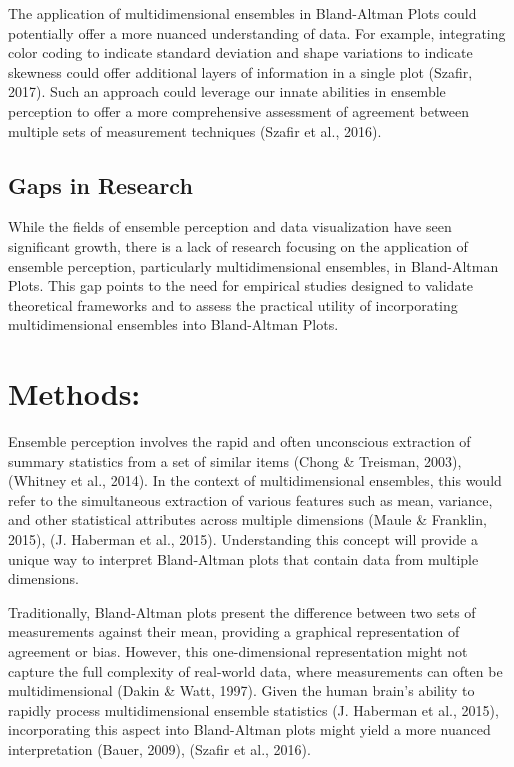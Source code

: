 \documentclass[print]{nuthesis}
\begin{document}
The application of multidimensional ensembles in Bland-Altman Plots could potentially offer a more nuanced understanding of data.
For example, integrating color coding to indicate standard deviation and shape variations to indicate skewness could offer additional layers of information in a single plot (Szafir, 2017).
Such an approach could leverage our innate abilities in ensemble perception to offer a more comprehensive assessment of agreement between multiple sets of measurement techniques (Szafir et al., 2016).

\hypertarget{gaps-in-research-1}{%
\subsection{Gaps in Research}\label{gaps-in-research-1}}

While the fields of ensemble perception and data visualization have seen significant growth, there is a lack of research focusing on the application of ensemble perception, particularly multidimensional ensembles, in Bland-Altman Plots.
This gap points to the need for empirical studies designed to validate theoretical frameworks and to assess the practical utility of incorporating multidimensional ensembles into Bland-Altman Plots.

\hypertarget{methods-1}{%
\section{Methods:}\label{methods-1}}

Ensemble perception involves the rapid and often unconscious extraction of summary statistics from a set of similar items (Chong \& Treisman, 2003), (Whitney et al., 2014).
In the context of multidimensional ensembles, this would refer to the simultaneous extraction of various features such as mean, variance, and other statistical attributes across multiple dimensions (Maule \& Franklin, 2015), (J. Haberman et al., 2015).
Understanding this concept will provide a unique way to interpret Bland-Altman plots that contain data from multiple dimensions.

Traditionally, Bland-Altman plots present the difference between two sets of measurements against their mean, providing a graphical representation of agreement or bias.
However, this one-dimensional representation might not capture the full complexity of real-world data, where measurements can often be multidimensional (Dakin \& Watt, 1997).
Given the human brain's ability to rapidly process multidimensional ensemble statistics (J. Haberman et al., 2015), incorporating this aspect into Bland-Altman plots might yield a more nuanced interpretation (Bauer, 2009), (Szafir et al., 2016).
\end{document}
